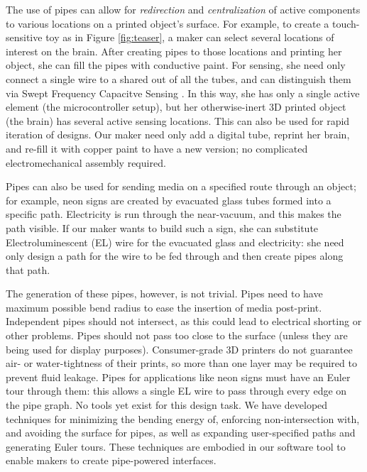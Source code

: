 The use of pipes can allow for \emph{redirection} and \emph{centralization} of active components to various locations on a printed object's surface.   For example, to create a touch-sensitive toy as in Figure \ref{fig:teaser}, a maker can select several locations of interest on the brain.  After creating pipes to those locations and printing her object, she can fill the pipes with conductive paint.  For sensing, she need only connect a single wire to a shared out of all the tubes, and can distinguish them via Swept Frequency Capacitve Sensing \cite{Sato-touche}.  In this way, she has only a single active element (the microcontroller setup), but her otherwise-inert 3D printed object (the brain) has several active sensing locations.  This can also be used for rapid iteration of designs.  Our maker need only add a digital tube, reprint her brain, and re-fill it with copper paint to have a new version; no complicated electromechanical assembly required.

Pipes can also be used for sending media on a specified route through an object; for example, neon signs are created by evacuated glass tubes formed into a specific path.  Electricity is run through the near-vacuum, and this makes the path visible.  If our maker wants to build such a sign, she can substitute Electroluminescent (EL) wire for the evacuated glass and electricity: she need only design a path for the wire to be fed through and then create pipes along that path.

The generation of these pipes, however, is not trivial.  Pipes need to have maximum possible bend radius to ease the insertion of media post-print.  Independent pipes should not intersect, as this could lead to electrical shorting or other problems.  Pipes should not pass too close to the surface (unless they are being used for display purposes).  Consumer-grade 3D printers do not guarantee air- or water-tightness of their prints, so more than one layer may be required to prevent fluid leakage.  Pipes for applications like neon signs must have an Euler tour through them: this allows a single EL wire to pass through every edge on the pipe graph.  No tools yet exist for this design task.  We have developed techniques for minimizing the bending energy of, enforcing non-intersection with, and avoiding the surface for pipes, as well as expanding user-specified paths and generating Euler tours.  These techniques are embodied in our software tool to enable makers to create pipe-powered interfaces.

